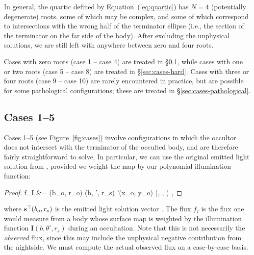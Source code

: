 \documentclass[modern]{aastex62}
\begin{document}
In general, the quartic defined by Equation~(\ref{eq:quartic}) has
$N=4$ (potentially degenerate) roots, some of which may be complex, and some
of which correspond to intersections with the wrong half of the
terminator ellipse (i.e., the section of the terminator on the far side
of the body). After excluding the unphysical solutions, we are still left with
anywhere between zero and four roots.

Cases with zero roots (case 1 -- case 4) are treated in \S\ref{sec:cases-easy},
while cases with one or two roots (case 5 -- case 8) are treated in
\S\ref{sec:cases-hard}. Cases with three or four roots
(case 9 -- case 10) are rarely encountered
in practice, but are possible for some pathological configurations; these are
treated in \S\ref{sec:cases-pathological}.

%

\subsection{Cases 1--5}
\label{sec:cases-easy}
%
Cases 1--5 (see Figure~\ref{fig:cases}) involve configurations in which the
occultor does not intersect with
the terminator of the occulted body, and are therefore fairly
straightforward to solve. In particular, we can use the original emitted
light solution from \citet{Luger2019}, provided we weight the map by our
polynomial illumination function:
%
\begin{proof}{}
    \label{eq:fI}
    f_I &=
    \sTe(b_o, r_o)
    (b, \theta', r_s)
    '(x_o, y_o)
    (, \Lambda, \Theta)
    \quad,
\end{proof}
%
where $\mathbf{s}^\top(b_o, r_o)$ is the emitted light solution vector
\citep[Equation~26 in][]{Luger2019}. The flux $f_I$ is the flux one would
measure from a body whose surface map is weighted by the illumination function
$\mathbf{I}(b, \theta', r_s)$ during an occultation. Note that this is not
necessarily the \emph{observed} flux, since this may include the unphysical
negative contribution from the nightside. We must compute the actual
observed flux on a case-by-case basis.
\end{document}
